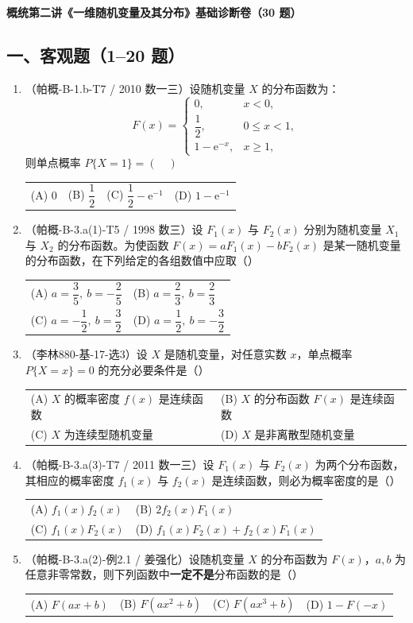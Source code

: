 \documentclass[12pt,a4paper]{ctexart}
\makeatletter
\newcommand{\optfour}[4]{\par\begin{tabularx}{\linewidth}{@{}X@{\quad}X@{\quad}X@{\quad}X@{}}#1&#2&#3&#4\end{tabularx}}
\newcommand{\opttwo}[4]{\par\begin{tabularx}{\linewidth}{@{}X@{\quad}X@{}}#1&#2\\#3&#4\end{tabularx}}
\makeatother
\begin{document}
\begin{center}
{\Large\bfseries 概统第二讲《一维随机变量及其分布》基础诊断卷（30 题）}
\end{center}

\subsection*{一、客观题（1--20 题）}

\begin{enumerate}[label=\arabic*.]

\item（帕概-B-1.b-T7 / 2010 数一三）设随机变量 $X$ 的分布函数为：
\[
F(x) = \begin{cases} 0, & x < 0, \\ \dfrac{1}{2}, & 0 \leqslant x < 1, \\ 1 - \mathrm{e}^{-x}, & x \geqslant 1, \end{cases}
\]
则单点概率 $P\{X = 1\} = (\quad)$
\optfour{(A) $0$}{(B) $\dfrac{1}{2}$}{(C) $\dfrac{1}{2} - \mathrm{e}^{-1}$}{(D) $1 - \mathrm{e}^{-1}$}

\item（帕概-B-3.a(1)-T5 / 1998 数三）设 $F_{1}(x)$ 与 $F_{2}(x)$ 分别为随机变量 $X_{1}$ 与 $X_{2}$ 的分布函数。为使函数 $F(x) = aF_{1}(x) - bF_{2}(x)$ 是某一随机变量的分布函数，在下列给定的各组数值中应取（\quad）
\opttwo{(A) $a = \dfrac{3}{5},\ b = -\dfrac{2}{5}$}{(B) $a = \dfrac{2}{3},\ b = \dfrac{2}{3}$}{(C) $a = -\dfrac{1}{2},\ b = \dfrac{3}{2}$}{(D) $a = \dfrac{1}{2},\ b = -\dfrac{3}{2}$}

\item（李林880-基-17-选3）设 $X$ 是随机变量，对任意实数 $x$，单点概率 $P\{X = x\} = 0$ 的充分必要条件是（\quad）
\opttwo{(A) $X$ 的概率密度 $f(x)$ 是连续函数}{(B) $X$ 的分布函数 $F(x)$ 是连续函数}{(C) $X$ 为连续型随机变量}{(D) $X$ 是非离散型随机变量}

\item（帕概-B-3.a(3)-T7 / 2011 数一三）设 $F_{1}(x)$ 与 $F_{2}(x)$ 为两个分布函数，其相应的概率密度 $f_{1}(x)$ 与 $f_{2}(x)$ 是连续函数，则必为概率密度的是（\quad）
\opttwo{(A) $f_{1}(x) f_{2}(x)$}{(B) $2 f_{2}(x) F_{1}(x)$}{(C) $f_{1}(x) F_{2}(x)$}{(D) $f_{1}(x) F_{2}(x) + f_{2}(x) F_{1}(x)$}

\item（帕概-B-3.a(2)-例2.1 / 姜强化）设随机变量 $X$ 的分布函数为 $F(x)$，$a, b$ 为任意非零常数，则下列函数中\textbf{一定不是}分布函数的是（\quad）
\optfour{(A) $F(ax + b)$}{(B) $F(ax^{2} + b)$}{(C) $F(ax^{3} + b)$}{(D) $1 - F(-x)$}


\end{enumerate}
\end{document}
